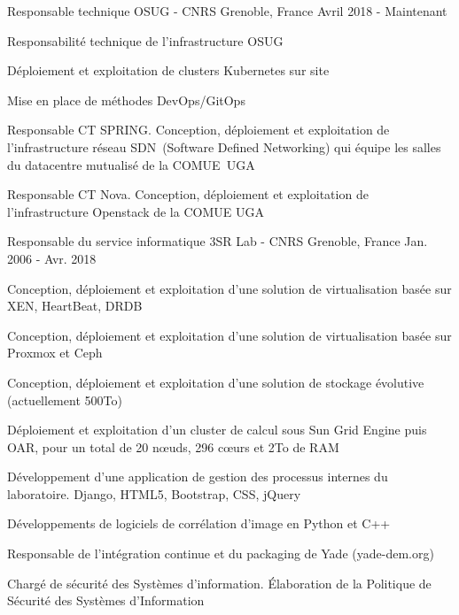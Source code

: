 

\begin{cventries}

  \cventry
    {Responsable technique} %
    {OSUG - CNRS} %
    {Grenoble, France} %
    {Avril 2018 - Maintenant} %
    {
      \begin{cvitems} %
        \item {Responsabilité technique de l'infrastructure OSUG}
        \item {Déploiement et exploitation de clusters Kubernetes sur site}
        \item {Mise en place de méthodes DevOps/GitOps}
        \item {Responsable CT SPRING. Conception, déploiement et exploitation de l'infrastructure réseau SDN (Software Defined Networking) qui équipe les salles du datacentre mutualisé de la COMUE UGA}
        \item {Responsable CT Nova. Conception, déploiement et exploitation de l'infrastructure Openstack de la COMUE UGA}
      \end{cvitems}
    }

  \cventry
    {Responsable du service informatique} %
    {3SR Lab - CNRS} %
    {Grenoble, France} %
    {Jan. 2006 - Avr. 2018} %
    {
      \begin{cvitems} %
        \item {Conception, déploiement et exploitation d'une solution de virtualisation basée sur XEN, HeartBeat, DRDB}
        \item {Conception, déploiement et exploitation d'une solution de virtualisation basée sur Proxmox et Ceph}
        \item {Conception, déploiement et exploitation d'une solution de stockage évolutive (actuellement 500To)}
        \item {Déploiement et exploitation d'un cluster de calcul sous Sun Grid Engine puis OAR, pour un total de 20 nœuds, 296 cœurs et 2To de RAM}
        \item {Développement d'une application de gestion des processus internes du laboratoire. Django, HTML5, Bootstrap, CSS, jQuery}
        \item {Développements de logiciels de corrélation d'image en Python et C++}
        \item {Responsable de l'intégration continue et du packaging de Yade (yade-dem.org)}
        \item {Chargé de sécurité des Systèmes d'information. Élaboration de la Politique de Sécurité des Systèmes d'Information}
      \end{cvitems}
    }


\end{cventries}
